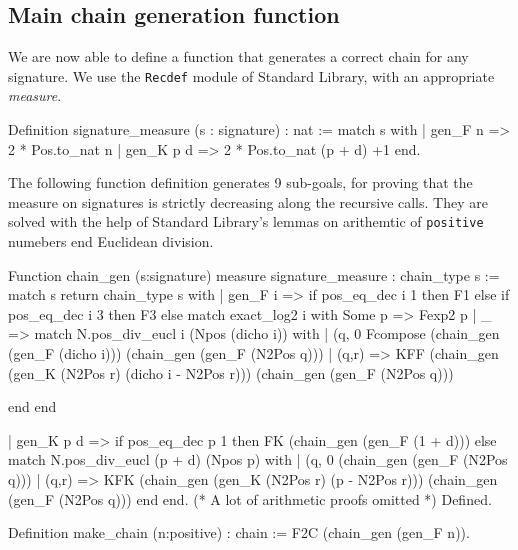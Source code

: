 \subsection{Main chain generation function}
We are now able to define a function that generates a correct chain 
for any signature. We use the \texttt{Recdef} module of Standard Library,
with an appropriate \emph{measure}.

\begin{Coqsrc}
Definition signature_measure (s : signature) : nat :=
match s with
  | gen_F n => 2 * Pos.to_nat n 
  | gen_K p d => 2 * Pos.to_nat (p + d) +1
end.
\end{Coqsrc}


The following function definition generates 9 sub-goals,
for proving that the measure on signatures is strictly decreasing along
the recursive calls. They are solved with the help of Standard Library's lemmas 
on arithemtic of \texttt{positive} numebers end Euclidean division.




\begin{Coqsrc}
Function chain_gen  (s:signature) {measure signature_measure}
:  chain_type s :=
  match s  return chain_type s with
    | gen_F i =>
      if pos_eq_dec i 1 then F1 else
        if pos_eq_dec i 3
        then F3
        else 
          match exact_log2 i with
              Some p => Fexp2 p
            | _ =>
              match N.pos_div_eucl i (Npos (dicho i))
              with
                | (q, 0%
                  Fcompose  (chain_gen (gen_F (dicho i)))
                            (chain_gen (gen_F (N2Pos q)))
                | (q,r)  => KFF (chain_gen
                                   (gen_K (N2Pos r)
                                          (dicho i - N2Pos r)))
                                (chain_gen (gen_F (N2Pos q)))
                                
              end end
\end{Coqsrc}

\begin{Coqsrc}
    | gen_K p d =>
      if pos_eq_dec p 1 then FK (chain_gen (gen_F (1 + d)))
      else
        match N.pos_div_eucl (p + d)  (Npos p) with
          | (q, 0%
                              (chain_gen (gen_F (N2Pos q)))
          | (q,r)  => KFK (chain_gen (gen_K (N2Pos r)
                                            (p - N2Pos r)))
                          (chain_gen (gen_F (N2Pos q)))
        end
  end.
(* A lot of arithmetic proofs omitted *)
Defined.

Definition make_chain (n:positive) : chain :=
 F2C (chain_gen (gen_F n)).

\end{Coqsrc}

